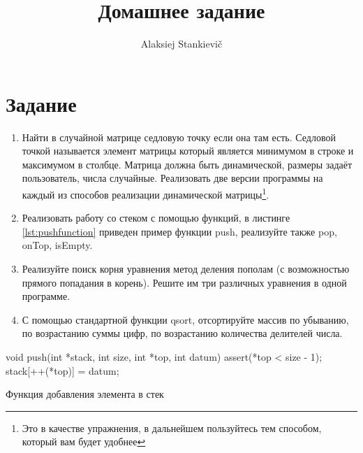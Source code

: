 \documentclass[12pt]{article}
\author{Alaksiej Stankievič}
\title{Домашнее задание}
\begin{document}

\section{Задание}


\begin{enumerate}
 \item Найти в случайной матрице седловую точку если она там есть. Седловой точкой называется элемент матрицы который является минимумом в строке и максимумом в столбце. Матрица должна быть динамической, размеры задаёт пользователь, числа случайные. Реализовать две версии программы на каждый из способов реализации динамической матрицы\footnote{Это в качестве упражнения, в дальнейшем пользуйтесь тем способом, который вам будет удобнее}.
 \item Реализовать работу со стеком с помощью функций, в листинге \ref{lst:pushfunction} приведен пример функции push, реализуйте также pop, onTop, isEmpty.
 \item Реализуйте поиск корня уравнения метод деления пополам (с возможностью прямого попадания в корень). Решите им три различных уравнения в одной программе.
 \item С помощью стандартной функции qsort, отсортируйте массив по убыванию, по возрастанию суммы цифр, по возрастанию количества делителей числа.
\end{enumerate}
\begin{listing}[H]
\begin{center}
\begin{ccode}
void push(int *stack, int size, int *top, int datum)
{
    assert(*top < size - 1);
    stack[++(*top)] = datum;
}
\end{ccode}
\end{center}
\caption{Функция добавления элемента в стек}
\label{lst:pushfunction}
\end{listing}
\end{document}
